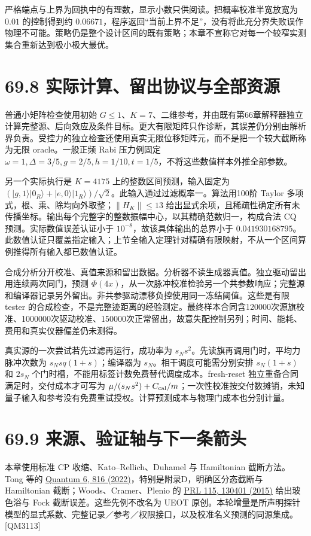 \documentclass[
  11pt,
  oneside]{book}
\begin{document}
严格端点与上界为回执中的有理数，显示小数只供阅读。把概率校准半宽放宽为
\(0.01\) 的控制得到约
\(0.06671\)，程序返回``当前上界不足''，没有将此充分界失败误作物理不可能。策略仍是整个设计区间的既有策略；本章不宣称它对每一个较窄实测集合重新达到极小极大最优。

\section{69.8 实际计算、留出协议与全部资源}

普通小矩阵检查使用初始
\(G\le1\)、\(K=7\)、二维参考，并由既有第66章解释器独立计算完整源、后向效应及条件目标。更大有限矩阵只作诊断，其误差仍分别由解析界负责。受控力的独立检查还使用真实无限位移矩阵元，而不是把一个较大截断称为无限
oracle。一般正频 Rabi 压力例固定
\(\omega=1,\Delta=3/5,g=2/5,h=1/10,t=1/5\)，不将这些数值样本外推全部参数。

另一个实际执行是 \(K=4175\) 上的整数区间预测，输入固定为
\((|g,1\rangle|0_R\rangle+|e,0\rangle|1_R\rangle)/\sqrt2\)。此输入通过过滤概率一。算法用100阶
Taylor 多项式，根、乘、除均向外取整；\(\|H_K\|\le13\)
给出显式余项，且稀疏性确定所有未传播坐标。输出每个完整字的整数振幅中心，以其精确范数归一，构成合法
CQ 预测。实际数值误差认证小于 \(10^{-8}\)，故该具体输出的总界小于
\(0.041930168795\)。此数值认证只覆盖指定输入；上节全输入定理针对精确有限映射，不从一个区间算例推得所有输入都已数值认证。

合成分析分开校准、真值来源和留出数据。分析器不读生成器真值。独立驱动留出用连续两次同门，预测
\(\Phi(4x)\)，从一次脉冲校准检验另一个共参数响应；完整源和编译器记录另外留出。非共参驱动漂移负控使用同一冻结阈值。这些是有限
tester
的合成检查，不是完整迹距离的经验测定。最终样本合同含120000次源旗校准、1000000次驱动校准、150000次正常留出，故意失配控制另列；时间、能耗、费用和真实仪器偏差仍未测得。

真实源的一次尝试若先过滤再运行，成功率为
\(s_Ns^2\)。先读旗再调用门时，平均力脉冲次数为 \(s_Nsq(1+s)\)；编译器为
\(s_N\)。相干调度可能需分别安排 \(s_N(1+s)\) 和 \(2s_N\)
个门时槽，不能用标签计数免费替代调度成本。fresh-reset
独立重备合同满足时，交付成本才可写为
\(\mu/(s_Ns^2)+C_{\rm cal}/m\)；一次性校准按交付数摊销，未知量子输入和参考没有免费重试授权。计算预测成本与物理门成本也分别计量。

\section{69.9 来源、验证轴与下一条箭头}

本章使用标准 CP 收缩、Kato--Rellich、Duhamel 与 Hamiltonian
截断方法。Tong 等的 \href{https://arxiv.org/abs/2110.06942v2}{Quantum 6,
816 (2022)}，特别是附录D，明确区分态截断与 Hamiltonian
截断；Woods、Cramer、Plenio 的
\href{https://arxiv.org/abs/1504.01531}{PRL 115, 130401 (2015)}
给出玻色浴与 Fock 截断误差。这些先例不改名为 UEOT
原创。本轮增量是所声明探针模型的显式系数、完整记录／参考／权限接口，以及校准名义预测的同源集成。{[}QM3113{]}
\end{document}
